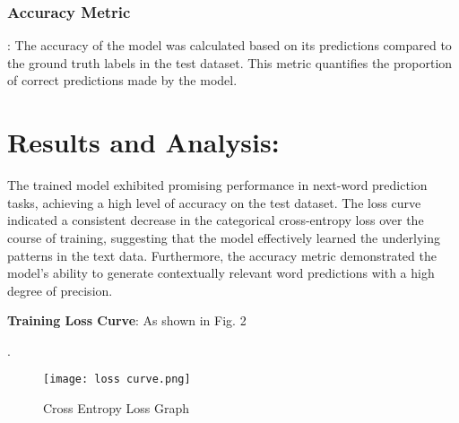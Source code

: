 \documentclass[conference]{IEEEtran}
\begin{document}
\subsubsection{\textbf{Accuracy Metric}}
: The accuracy of the model was calculated based on its predictions compared to the ground truth labels in the test dataset. This metric quantifies the proportion of correct predictions made by the model.


\section{Results and Analysis:}

The trained model exhibited promising performance in next-word prediction tasks, achieving a high level of accuracy on the test dataset. The loss curve indicated a consistent decrease in the categorical cross-entropy loss over the course of training, suggesting that the model effectively learned the underlying patterns in the text data. Furthermore, the accuracy metric demonstrated the model's ability to generate contextually relevant word predictions with a high degree of precision.

\textbf{Training Loss Curve}: 
As shown in Fig. 2

.
\begin{figure}
    \centering
    \texttt{[image: loss curve.png]}
    \caption{Cross Entropy Loss Graph}
    \label{fig:enter-label}
\end{figure}
 
\end{document}
